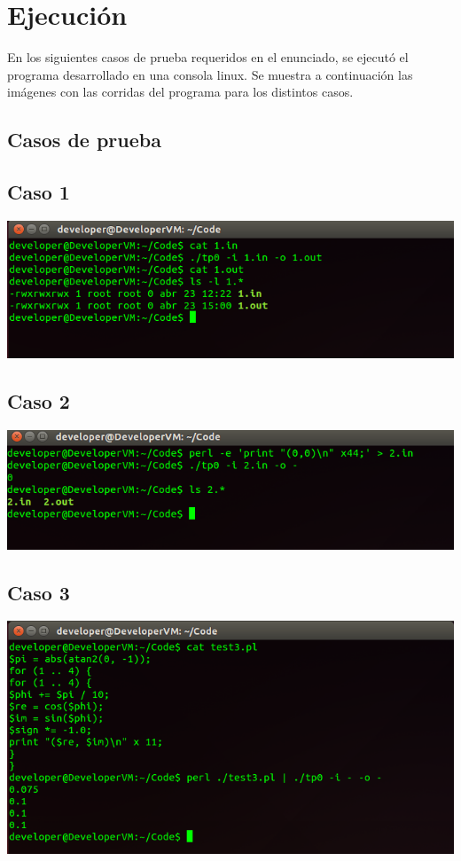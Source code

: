 \documentclass[10pt,a4paper]{article}
\begin{document}
\section{Ejecución}
En los siguientes casos de prueba requeridos en el enunciado, se ejecutó el programa desarrollado en una consola linux. Se muestra a continuación las imágenes con las corridas del programa para los distintos casos.\\
\subsection{Casos de prueba}
\subsection{Caso 1}
\begin{center}
\includegraphics[scale=0.4]{Imagenes/Caso1.png} 
\end{center}
\subsection{Caso 2}
\begin{center}
\includegraphics[scale=0.4]{Imagenes/Caso2.png} 
\end{center}
\subsection{Caso 3}
\begin{center}
\includegraphics[scale=0.4]{Imagenes/Caso3.png} 
\end{center}
\end{document}
